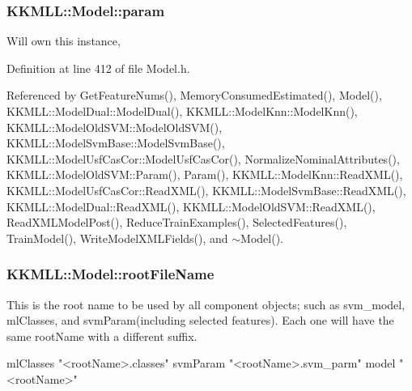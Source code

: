 \subsubsection[{\texorpdfstring{param}{param}}]{ K\+K\+M\+L\+L\+::\+Model\+::param\hspace{0.3cm}{\ttfamily [protected]}}\hypertarget{class_k_k_m_l_l_1_1_model_a46bd4d1b3ab8d3d9847c1b00b7c0b66f}{}\label{class_k_k_m_l_l_1_1_model_a46bd4d1b3ab8d3d9847c1b00b7c0b66f}
Will own this instance, 

Definition at line 412 of file Model.\+h.



Referenced by Get\+Feature\+Nums(), Memory\+Consumed\+Estimated(), Model(), K\+K\+M\+L\+L\+::\+Model\+Dual\+::\+Model\+Dual(), K\+K\+M\+L\+L\+::\+Model\+Knn\+::\+Model\+Knn(), K\+K\+M\+L\+L\+::\+Model\+Old\+S\+V\+M\+::\+Model\+Old\+S\+V\+M(), K\+K\+M\+L\+L\+::\+Model\+Svm\+Base\+::\+Model\+Svm\+Base(), K\+K\+M\+L\+L\+::\+Model\+Usf\+Cas\+Cor\+::\+Model\+Usf\+Cas\+Cor(), Normalize\+Nominal\+Attributes(), K\+K\+M\+L\+L\+::\+Model\+Old\+S\+V\+M\+::\+Param(), Param(), K\+K\+M\+L\+L\+::\+Model\+Knn\+::\+Read\+X\+M\+L(), K\+K\+M\+L\+L\+::\+Model\+Usf\+Cas\+Cor\+::\+Read\+X\+M\+L(), K\+K\+M\+L\+L\+::\+Model\+Svm\+Base\+::\+Read\+X\+M\+L(), K\+K\+M\+L\+L\+::\+Model\+Dual\+::\+Read\+X\+M\+L(), K\+K\+M\+L\+L\+::\+Model\+Old\+S\+V\+M\+::\+Read\+X\+M\+L(), Read\+X\+M\+L\+Model\+Post(), Reduce\+Train\+Examples(), Selected\+Features(), Train\+Model(), Write\+Model\+X\+M\+L\+Fields(), and $\sim$\+Model().

\subsubsection[{\texorpdfstring{root\+File\+Name}{rootFileName}}]{ K\+K\+M\+L\+L\+::\+Model\+::root\+File\+Name\hspace{0.3cm}{\ttfamily [protected]}}\hypertarget{class_k_k_m_l_l_1_1_model_a242173cd17f4a84ce1ee47fc7fabd9a2}{}\label{class_k_k_m_l_l_1_1_model_a242173cd17f4a84ce1ee47fc7fabd9a2}
This is the root name to be used by all component objects; such as svm\+\_\+model, ml\+Classes, and svm\+Param(including selected features). Each one will have the same root\+Name with a different suffix. 
\begin{DoxyCode}
mlClasses  \textcolor{stringliteral}{"<rootName>.classes"}
svmParam      \textcolor{stringliteral}{"<rootName>.svm\_parm"}
model         \textcolor{stringliteral}{"<rootName>"}
\end{DoxyCode}
 

